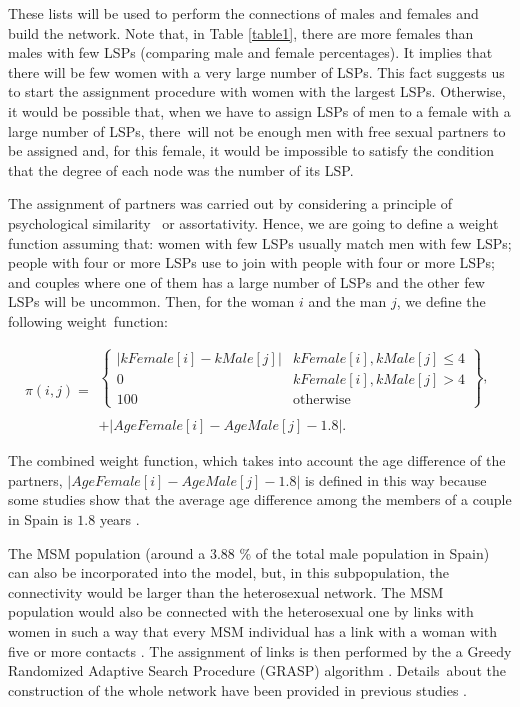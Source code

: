 These lists will be used to perform the connections of males and females and build the network.
Note that, in Table \ref{table1}, there are more females than males with few LSPs (comparing male and female percentages). It implies that there will be few women with a very large number of LSPs. This fact suggests us to start the assignment procedure with women with the largest LSPs. Otherwise, it would be possible that, when we have to assign LSPs of men to a female with a large number of LSPs, there~will not be enough men with free sexual partners to be assigned and, for this female, it would be impossible to satisfy the condition that the degree of each node was the number of its LSP. 

The assignment of partners was carried out by considering a principle of psychological similarity~\cite{gentner1997structure} or assortativity.
Hence, we are going to define a weight function assuming that: women with few LSPs usually match men with few LSPs; people with four or more LSPs use to join with people with four or more LSPs; and couples where one of them has a large number of LSPs and the other few LSPs will be uncommon. Then, for the woman $i$ and the man $j$, we define the following weight~function:

\begin{equation}
\pi(i,j) = 
\begin{array}{l}
\left\lbrace \begin{array}{lc}
| kFemale[i] - kMale[j] | & kFemale[i], kMale[j] \le 4 \\
0 & kFemale[i], kMale[j] > 4 \\
100 & \mbox{otherwise}
\end{array} \right\rbrace, \\
\\
 + | AgeFemale[i] - AgeMale[j] - 1.8 |.
\end{array}
\label{peso}
\end{equation}

The combined weight function, which takes into account the age difference of the partners, $\vert AgeFemale[i] - AgeMale[j] - 1.8 \vert$ is defined in this way because some studies show that the average age difference among the members of a couple in Spain is $1.8$ years \cite{miret2010similitud}. 

The MSM population (around a $3.88$ \% of the total male population in Spain) can also be incorporated into the model, but, in this subpopulation, the connectivity would be larger than the heterosexual network.
The MSM population would also be connected with the heterosexual one by links with women in such a way that every MSM individual has a link with a woman with five or more contacts \cite{acedo2017calibrating}. The assignment of links is then performed by the a Greedy Randomized Adaptive Search Procedure (GRASP) algorithm 
\cite{cormen2009introduction,feo1995greedy}. Details~about the construction of the whole network have been provided in previous studies \cite{acedo2017calibrating,BuildingLSPNova}. 


